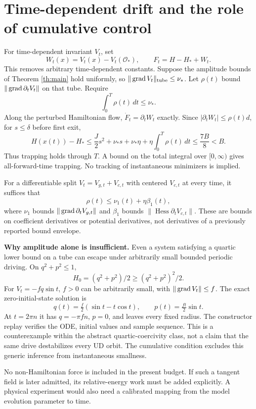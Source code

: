 \documentclass[11pt,a4paper]{article}
\begin{document}
\section{Time-dependent drift and the role of cumulative control}
For time-dependent invariant $V_t$, set
\[
W_t(x)=V_t(x)-V_t(\mathcal O_*),\qquad F_t=H-H_*+W_t.
\]
This removes arbitrary time-dependent constants. Suppose the amplitude bounds of Theorem \ref{th:main} hold uniformly, so $\|\operatorname{grad} V_t\|_{\rm tube}\le\nu_*$. Let $\rho(t)$ bound $\|\operatorname{grad}\partial_t V_t\|$ on that tube. Require
\[
\boxed{\int_0^T\rho(t)\,dt\le\nu_* .}
\]
Along the perturbed Hamiltonian flow, $\dot F_t=\partial_tW_t$ exactly. Since $|\partial_tW_t|\le\rho(t)d$, for $s\le\delta$ before first exit,
\[
H(x(t))-H_*\le\frac J2s^2+\nu_*s+\nu_*\eta
+\eta\int_0^T\rho(t)\,dt
\le\frac{7B}{8}<B.
\]
Thus trapping holds through $T$. A bound on the total integral over $[0,\infty)$ gives all-forward-time trapping. No tracking of instantaneous minimizers is implied.

For a differentiable split $V_t=V_{g,t}+V_{c,t}$ with centered $V_{c,t}$ at every time, it suffices that
\[
\rho(t)\le\nu_1(t)+\eta\beta_1(t),
\]
where $\nu_1$ bounds $\|\operatorname{grad}\partial_tV_{g,t}\|$ and $\beta_1$ bounds $\|\operatorname{Hess}\partial_tV_{c,t}\|$. These are bounds on coefficient derivatives or potential derivatives, not derivatives of a previously reported bound envelope.

\textbf{Why amplitude alone is insufficient.} Even a system satisfying a quartic lower bound on a tube can escape under arbitrarily small bounded periodic driving. On $q^2+p^2\le1$,
\[
H_0=(q^2+p^2)/2\ge(q^2+p^2)^2/2.
\]
For $V_t=-f q\sin t$, $f>0$ can be arbitrarily small, with $\|\operatorname{grad} V_t\|\le f$. The exact zero-initial-state solution is
\[
q(t)=\tfrac f2(\sin t-t\cos t),\qquad p(t)=\tfrac{ft}{2}\sin t.
\]
At $t=2\pi n$ it has $q=-\pi fn$, $p=0$, and leaves every fixed radius. The constructor replay verifies the ODE, initial values and sample sequence. This is a counterexample within the abstract quartic-coercivity class, not a claim that the same drive destabilizes every UD orbit. The cumulative condition excludes this generic inference from instantaneous smallness.

No non-Hamiltonian force is included in the present budget. If such a tangent field is later admitted, its relative-energy work must be added explicitly. A physical experiment would also need a calibrated mapping from the model evolution parameter to time.
\newpage
\end{document}

